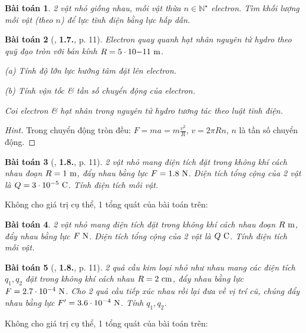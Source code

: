 \documentclass{article}
\numberwithin{equation}{section}
\newtheorem{baitoan}{Bài toán}[section]
\begin{document}
\begin{baitoan}
	2 vật nhỏ giống nhau, mỗi vật thừa $n\in\mathbb{N}^\star$ electron. Tìm khối lượng mỗi vật (theo $n$) để lực tĩnh điện bằng lực hấp dẫn.
\end{baitoan}

\begin{baitoan}[\cite{Giai_Toan_Vat_Ly_11_tap_1}, \textbf{1.7.}, p. 11]
	Electron quay quanh hạt nhân nguyên tử hydro theo quỹ đạo tròn với bán kính $R = 5\cdot 10{-11}\ {\rm m}$.
	\begin{enumerate*}
		\item[(a)] Tính độ lớn lực hướng tâm đặt lên electron.
		\item[(b)] Tính vận tốc \& tần số chuyển động của electron.
	\end{enumerate*}
	Coi electron \& hạt nhân trong nguyên tử hydro tương tác theo luật tĩnh điện.
\end{baitoan}

\begin{proof}[Hint]
	Trong chuyển động tròn đều: $F = ma = m\frac{v^2}{R}$, $v = 2\pi Rn$, $n$ là tần số chuyển động. 
\end{proof}

\begin{baitoan}[\cite{Giai_Toan_Vat_Ly_11_tap_1}, \textbf{1.8.}, p. 11]
	2 vật nhỏ mang điện tích đặt trong không khí cách nhau đoạn $R = 1\ {\rm m}$, đẩy nhau bằng lực $F = 1.8\ {\rm N}$. Điện tích tổng cộng của 2 vật là $Q = 3\cdot 10^{-5}\ {\rm C}$. Tính điện tích mỗi vật.
\end{baitoan}
Không cho giá trị cụ thể, 1 tổng quát của bài toán trên:

\begin{baitoan}
	2 vật nhỏ mang điện tích đặt trong không khí cách nhau đoạn $R\ {\rm m}$, đẩy nhau bằng lực $F\ {\rm N}$. Điện tích tổng cộng của 2 vật là $Q\ {\rm C}$. Tính điện tích mỗi vật.
\end{baitoan}

\begin{baitoan}[\cite{Giai_Toan_Vat_Ly_11_tap_1}, \textbf{1.8.}, p. 11]
	2 quả cầu kim loại nhỏ như nhau mang các điện tích $q_1,q_2$ đặt trong không khí cách nhau $R = 2\ {\rm cm}$, đẩy nhau bằng lực $F = 2.7\cdot 10^{-4}\ {\rm N}$. Cho 2 quả cầu tiếp xúc nhau rồi lại đưa về vị trí cũ, chúng đẩy nhau bằng lực $F' = 3.6\cdot 10^{-4}\ {\rm N}$. Tính $q_1,q_2$.
\end{baitoan}
Không cho giá trị cụ thể, 1 tổng quát của bài toán trên:
\end{document}
